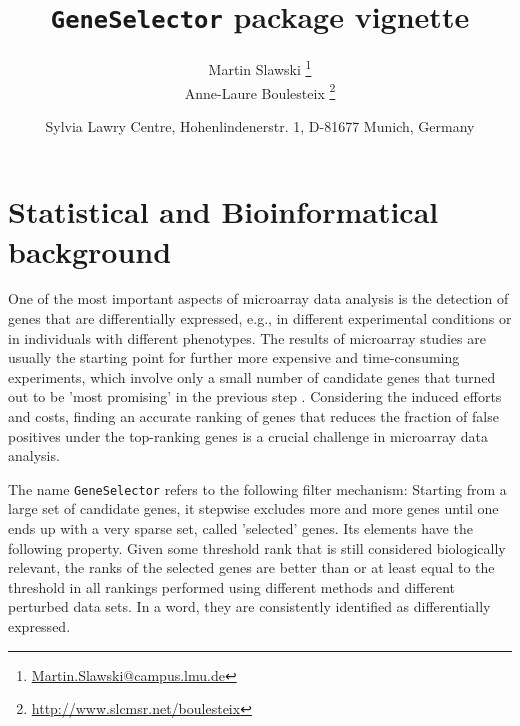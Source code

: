 

\title{\large{\texttt{GeneSelector}} package vignette}
\author{Martin Slawski \footnote{\url{Martin.Slawski@campus.lmu.de}}\\
        Anne-Laure Boulesteix \footnote{\url{http://www.slcmsr.net/boulesteix}}}

\usepackage{e:/R_installation/share/texmf/Sweave}

\date{\normalsize{Sylvia Lawry Centre, Hohenlindenerstr. 1, D-81677 Munich, Germany}}
\maketitle


\section{Statistical and Bioinformatical background}

One of the most important aspects of microarray data analysis is
the detection of genes that are differentially expressed, e.g., in different
experimental conditions or in individuals with different phenotypes.
The results of microarray studies are usually the starting point
for further more expensive and time-consuming experiments, which involve only a small number
of candidate genes that turned out to be 'most promising' in the previous step \citet{aer2006}.
Considering the induced efforts and costs, finding an accurate ranking of genes that
reduces the fraction of false positives under the top-ranking genes is a
crucial challenge in microarray data analysis.

The name \texttt{GeneSelector} refers to the following filter mechanism:
Starting from a large set of candidate genes, it stepwise excludes
more and more genes until one ends up with a very sparse set, called
'selected' genes. Its elements have the following property. Given some
threshold rank that is still considered biologically relevant,
the ranks of the selected genes are better than or at least equal to the threshold in all rankings performed
using different methods and different perturbed data sets. In a word,
they are consistently identified as differentially expressed.

